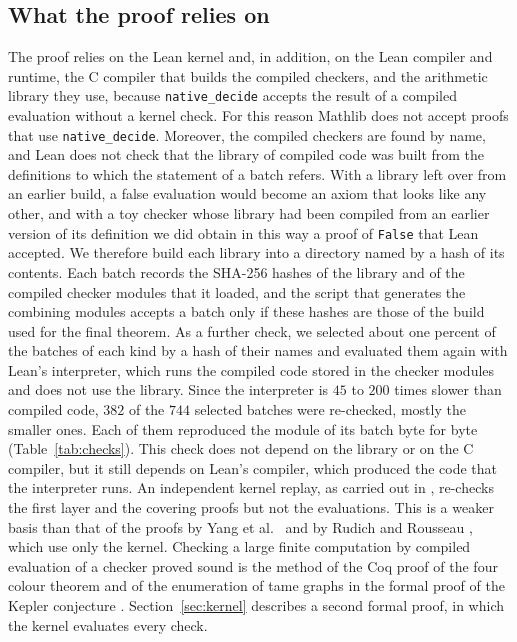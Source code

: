 \documentclass[11pt]{amsart}
\theoremstyle{definition}
\theoremstyle{remark}
\numberwithin{equation}{section}
\begin{document}
\subsection{What the proof relies on}
The proof relies on the Lean kernel and, in addition, on the Lean compiler and runtime, the C compiler that builds the compiled checkers, and the arithmetic library they use, because \texttt{native\_decide} accepts the result of a compiled evaluation without a kernel check. For this reason Mathlib does not accept proofs that use \texttt{native\_decide}. Moreover, the compiled checkers are found by name, and Lean does not check that the library of compiled code was built from the definitions to which the statement of a batch refers. With a library left over from an earlier build, a false evaluation would become an axiom that looks like any other, and with a toy checker whose library had been compiled from an earlier version of its definition we did obtain in this way a proof of \texttt{False} that Lean accepted. We therefore build each library into a directory named by a hash of its contents. Each batch records the SHA-256 hashes of the library and of the compiled checker modules that it loaded, and the script that generates the combining modules accepts a batch only if these hashes are those of the build used for the final theorem. As a further check, we selected about one percent of the batches of each kind by a hash of their names and evaluated them again with Lean's interpreter, which runs the compiled code stored in the checker modules and does not use the library. Since the interpreter is $45$ to $200$ times slower than compiled code, $382$ of the $744$ selected batches were re-checked, mostly the smaller ones. Each of them reproduced the module of its batch byte for byte (Table~\ref{tab:checks}). This check does not depend on the library or on the C compiler, but it still depends on Lean's compiler, which produced the code that the interpreter runs. An independent kernel replay, as carried out in \cite{RR26}, re-checks the first layer and the covering proofs but not the evaluations. This is a weaker basis than that of the proofs by Yang et al.\ \cite{Yan26} and by Rudich and Rousseau \cite{RR26}, which use only the kernel. Checking a large finite computation by compiled evaluation of a checker proved sound is the method of the Coq proof of the four colour theorem \cite{Gon08} and of the enumeration of tame graphs in the formal proof of the Kepler conjecture \cite{Hal17}. Section~\ref{sec:kernel} describes a second formal proof, in which the kernel evaluates every check.
\end{document}
